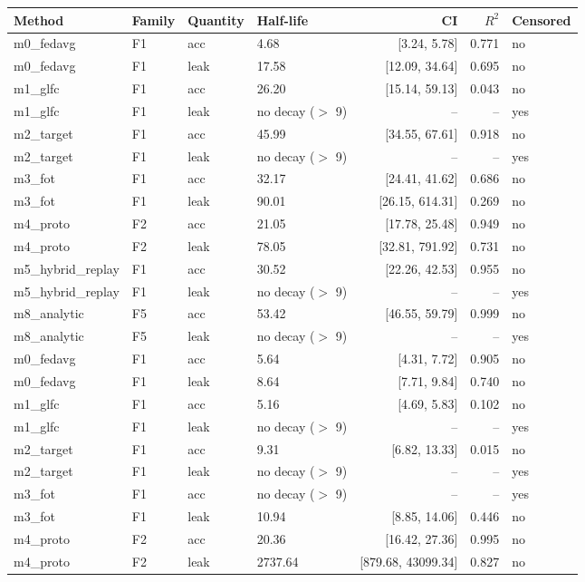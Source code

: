 \begin{tabular}{llllrrl}
\toprule
Method & Family & Quantity & Half-life & CI & $R^2$ & Censored \\
\midrule
m0\_fedavg & F1 & acc & 4.68 & [3.24, 5.78] & 0.771 & no \\
m0\_fedavg & F1 & leak & 17.58 & [12.09, 34.64] & 0.695 & no \\
m1\_glfc & F1 & acc & 26.20 & [15.14, 59.13] & 0.043 & no \\
m1\_glfc & F1 & leak & no decay ($>$ 9) & -- & -- & yes \\
m2\_target & F1 & acc & 45.99 & [34.55, 67.61] & 0.918 & no \\
m2\_target & F1 & leak & no decay ($>$ 9) & -- & -- & yes \\
m3\_fot & F1 & acc & 32.17 & [24.41, 41.62] & 0.686 & no \\
m3\_fot & F1 & leak & 90.01 & [26.15, 614.31] & 0.269 & no \\
m4\_proto & F2 & acc & 21.05 & [17.78, 25.48] & 0.949 & no \\
m4\_proto & F2 & leak & 78.05 & [32.81, 791.92] & 0.731 & no \\
m5\_hybrid\_replay & F1 & acc & 30.52 & [22.26, 42.53] & 0.955 & no \\
m5\_hybrid\_replay & F1 & leak & no decay ($>$ 9) & -- & -- & yes \\
m8\_analytic & F5 & acc & 53.42 & [46.55, 59.79] & 0.999 & no \\
m8\_analytic & F5 & leak & no decay ($>$ 9) & -- & -- & yes \\
m0\_fedavg & F1 & acc & 5.64 & [4.31, 7.72] & 0.905 & no \\
m0\_fedavg & F1 & leak & 8.64 & [7.71, 9.84] & 0.740 & no \\
m1\_glfc & F1 & acc & 5.16 & [4.69, 5.83] & 0.102 & no \\
m1\_glfc & F1 & leak & no decay ($>$ 9) & -- & -- & yes \\
m2\_target & F1 & acc & 9.31 & [6.82, 13.33] & 0.015 & no \\
m2\_target & F1 & leak & no decay ($>$ 9) & -- & -- & yes \\
m3\_fot & F1 & acc & no decay ($>$ 9) & -- & -- & yes \\
m3\_fot & F1 & leak & 10.94 & [8.85, 14.06] & 0.446 & no \\
m4\_proto & F2 & acc & 20.36 & [16.42, 27.36] & 0.995 & no \\
m4\_proto & F2 & leak & 2737.64 & [879.68, 43099.34] & 0.827 & no \\

\end{tabular}
